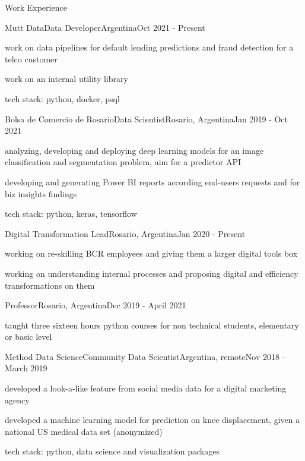 \documentclass{article}
\newlength{\tabin}
\newlength{\secsep}
\newcommand{\lineunder}{\vspace*{-8pt} \\ \hspace*{-6pt} \hrulefill \\ \vspace*{-15pt}}
\newenvironment{tabbedsection}[1]{
  \begin{list}{}{
      \setlength{\itemsep}{0pt}
      \setlength{\labelsep}{0pt}
      \setlength{\labelwidth}{0pt}
      \setlength{\leftmargin}{\tabin}
      \setlength{\rightmargin}{\tabin}
      \setlength{\listparindent}{0pt}
      \setlength{\parsep}{0pt}
      \setlength{\parskip}{0pt}
      \setlength{\partopsep}{0pt}
      \setlength{\topsep}{#1}
    }
  \item[]
}{\end{list}}
\newenvironment{resume_section}[1]{
  \filbreak
  \vspace{2\secsep}
  \textsc{\large#1}
  \lineunder
  \begin{tabbedsection}{\secsep}
}{\end{tabbedsection}}
\newenvironment{subitems}{
  \renewcommand{\labelitemi}{-}
  \begin{itemize}
      \setlength{\labelsep}{1em}
}{\end{itemize}}
\newenvironment{resume_employer}[4]{
  \vspace{\secsep}
  \textbf{#1} \\ 
  \indent {\small #2} \hfill {\footnotesize#3 (#4)}
  \begin{tabbedsection}{0pt}
  \begin{subitems}
}{\end{subitems}\end{tabbedsection}}
\begin{document}
\begin{resume_section}{Work Experience}
  \begin{resume_employer}{Mutt Data}{Data Developer}{Argentina}{Oct 2021 - Present}
    \item work on data pipelines for default lending predictions and fraud detection for a telco customer
    \item work on an internal utility library
    \item tech stack: python, docker, psql
  \end{resume_employer}

  \begin{resume_employer}{Bolsa de Comercio de Rosario}{Data Scientist}{Rosario, Argentina}{Jan 2019 - Oct 2021}
    \item analyzing, developing and deploying deep learning models for an image classification and segmentation problem, aim for a predictor API 
    \item developing and generating Power BI reports according end-users requests and for biz insights findings
    \item tech stack: python, keras, tensorflow
  \end{resume_employer}
  
  \begin{resume_employer}{}{Digital Transformation Lead}{Rosario, Argentina}{Jan 2020 - Present}
    \item working on re-skilling BCR employees and giving them a larger digital tools box
    \item working on understanding internal processes and proposing digital and efficiency transformations on them
  \end{resume_employer}
  
  \begin{resume_employer}{}{Professor}{Rosario, Argentina}{Dec 2019 - April 2021}
    \item taught three sixteen hours python courses for non technical students, elementary or basic level
  \end{resume_employer}
  
  \begin{resume_employer}{Method Data Science}{Community Data Scientist}{Argentina, remote}{Nov 2018 - March 2019}
    \item developed a look-a-like feature from social media data for a digital marketing agency
    \item developed a machine learning model for prediction on knee displacement, given a national US medical data set (anonymized)
    \item tech stack: python, data science and visualization packages
  \end{resume_employer}
  

\end{resume_section}
\end{document}
